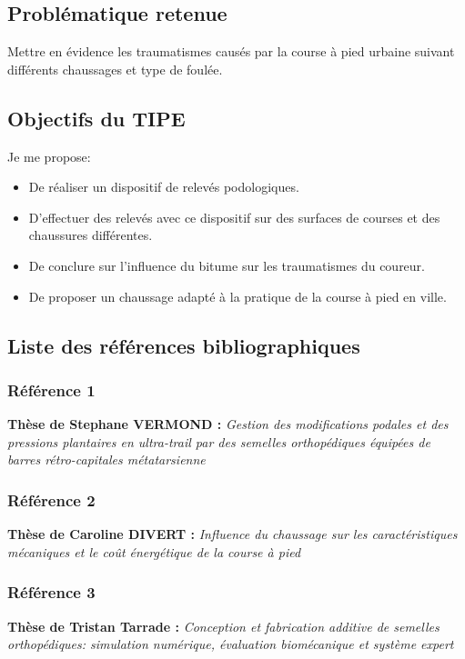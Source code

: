 \documentclass[11pt]{article}
\begin{document}
\subsection{Problématique retenue}
\label{sec:org024e323}
Mettre en évidence les traumatismes causés par la course à pied urbaine suivant différents chaussages et type de foulée.\\\empty
\subsection{Objectifs du TIPE}
\label{sec:org22c99bf}
Je me propose:\\\empty
\begin{itemize}
\item De réaliser un dispositif de relevés podologiques.\\\empty
\item D'effectuer des relevés avec ce dispositif sur des surfaces de courses et des chaussures différentes.\\\empty
\item De conclure sur l'influence du bitume sur les traumatismes du coureur.\\\empty
\item De proposer un chaussage adapté à la pratique de la course à pied en ville.\\\empty
\end{itemize}

\subsection{Liste des références bibliographiques}
\label{sec:org8b4ac8a}
\subsubsection{Référence 1}
\label{sec:org51b067e}
\textbf{Thèse de Stephane VERMOND :} \emph{Gestion des modifications podales et des pressions plantaires en ultra-trail par des semelles orthopédiques équipées de barres rétro-capitales métatarsienne}\\\empty
\subsubsection{Référence 2}
\label{sec:orgefdc735}
\textbf{Thèse de Caroline DIVERT :} \emph{Influence du chaussage sur les caractéristiques mécaniques et le coût énergétique de la course à pied}\\\empty
\subsubsection{Référence 3}
\label{sec:org8712a21}
\textbf{Thèse de Tristan Tarrade :} \emph{Conception et fabrication additive de semelles orthopédiques: simulation numérique, évaluation biomécanique et système expert}\\\empty
\end{document}
